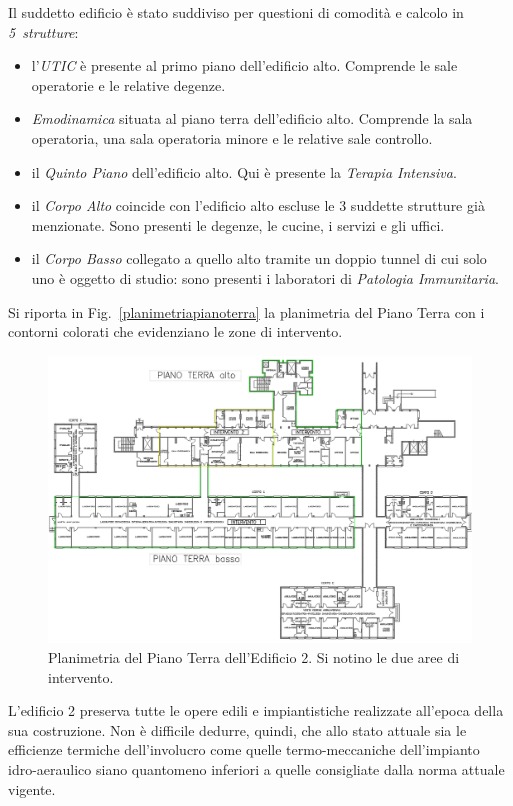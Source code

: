 Il suddetto edificio è stato suddiviso per questioni di comodità e calcolo in \emph{5~strutture}:
\begin{itemize}
	\item l'\emph{UTIC} è presente al primo piano dell'edificio alto. Comprende le sale operatorie e le relative degenze.
	\item \emph{Emodinamica} situata al piano terra dell'edificio alto. Comprende la sala operatoria, una sala operatoria minore e le relative sale controllo.
	\item il \emph{Quinto Piano} dell'edificio alto. Qui è presente la \emph{Terapia Intensiva}.
	\item il \emph{Corpo Alto} coincide con l'edificio alto escluse le 3 suddette strutture già menzionate. Sono presenti le degenze, le cucine, i servizi e gli uffici.
	\item il \emph{Corpo Basso} collegato a quello alto tramite un doppio tunnel di cui solo uno è oggetto di studio: sono presenti i laboratori di \emph{Patologia Immunitaria}.
\end{itemize}
Si riporta in Fig.~\vref{planimetriapianoterra} la planimetria del Piano Terra con i contorni colorati che evidenziano le zone di intervento. %
\begin{figure}
	\centering
	\caption{Planimetria del Piano Terra dell'Edificio 2. Si notino le due aree di intervento.}
	\label{planimetriapianoterra}
	\includegraphics[width=\textheight]{6_2_cap/img/piano_terra}	
\end{figure}

L'edificio 2 preserva tutte le opere edili e impiantistiche realizzate all'epoca della sua costruzione. Non è difficile dedurre, quindi, che allo stato attuale sia le efficienze termiche dell'involucro come quelle termo-meccaniche dell'impianto idro-aeraulico siano quantomeno inferiori a quelle consigliate dalla norma attuale vigente. 

